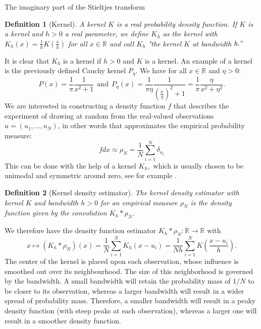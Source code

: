 \documentclass[11pt, a4paper, oneside]{book}
\numberwithin{equation}{chapter}
\newtheorem{definition}{Definition}[section]
\begin{document}
\begin{section}{The imaginary part of the Stieltjes transform}
\begin{definition}[Kernel] A kernel $K$ is a real probability density function. If $K$ is a kernel and $h>0$ a real parameter, we define $K_h$ as the kernel with $K_h(x) = \frac{1}{h} K(\frac{x}{h})$ for all $x \in \mathbb{R}$ and call $K_h $ "the kernel $K$ at bandwidth $h."$
\end{definition}

It is clear that $K_h$ is a kernel if $h>0$ and $K$ is a kernel. An example of a kernel is the previously defined Cauchy kernel $P_{\eta}$. We have for all $x \in \mathbb{R}$ and $\eta>0:$
%
\[
P(x) = \frac{1}{\pi} \frac{1}{x^2+1} \ \ \text{and} \ \  P_\eta(x) = \frac{1}{\pi \eta} \frac{1}{ \left (\frac{x}{\eta} \right )^2+1} = \frac{1}{\pi} \frac{\eta}{x^2 + \eta^2}.
\]
%
We are interested in constructing a density function $f$ that describes the experiment of drawing at random from the real-valued observations $u = (u_1,...,u_N)$, in other words that approximates the empirical probability measure:
%
\[ 
f dx \approx \rho_N = \frac{1}{N} \sum \limits_{i=1}^N \delta_{u_i}
\]
%
This can be done with the help of a kernel $K_h,$ which is usually chosen to be unimodal and symmetric around zero, see for example \cite{parzen1962estimation}.

\begin{definition}[Kernel density estimator] The kernel density estimator with kernel $K$ and bandwidth $h>0$ for an empirical measure $\rho_N$ is the density function given by the convolution $K_h \ast \rho_N$.
\end{definition}

We therefore have the density function estimator $K_h \ast \rho_N: \mathbb{R} \to \mathbb{R}$ with
%
\[
x \mapsto (K_h \ast \rho_N)(x) = \frac{1}{N} \sum \limits_{i=1}^N K_h(x-u_i) = \frac{1}{N h} \sum \limits_{i=1}^N K \left ( \frac{x - u_i}{h} \right ).
\]
%
The center of the kernel is placed upon each observation, whose influence is smoothed out over its neighbourhood. The size of this neighborhood is governed by the bandwidth. A small bandwidth will retain the probability mass of $1/N$ to be closer to its observation, whereas a larger bandwidth will result in a wider spread of probability mass. Therefore, a smaller bandwidth will result in a peaky density function (with steep peaks at each observation), whereas a larger one will result in a smoother density function.


\end{section}
\end{document}
